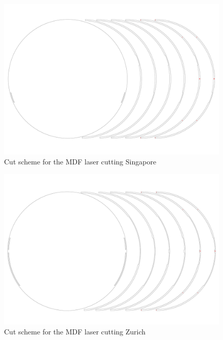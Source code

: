 \documentclass[a4paper,9pt]{article}
\begin{document}
    \begin{landscape}
        \begin{figure}[H]
        \centering
        \includegraphics[width=.95\linewidth]{Images/cut sg.pdf}
       \caption{Cut scheme for the MDF laser cutting Singapore}
         \label{cuuuut2}
    \end{figure}
    \begin{figure}[H]
         \centering
        \includegraphics[width=.95\linewidth]{Images/cut zh.pdf}
    \caption{Cut scheme for the MDF laser cutting Zurich}
    \label{cuuuut}
    \end{figure}
    \end{landscape}
\end{document}
